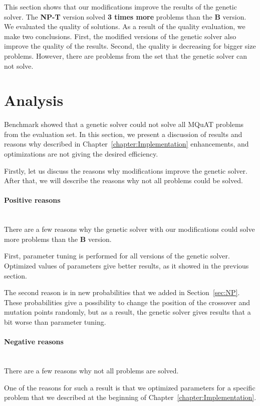 This section shows that our modifications improve the results of the genetic solver. The \textbf{NP-T} version solved \textbf{3 times more} problems than the \textbf{B} version. We evaluated the quality of solutions. As a result of the quality evaluation, we make two conclusions. First, the modified versions of the genetic solver also improve the quality of the results. Second, the quality is decreasing for bigger size problems.
However, there are problems from the set that the genetic solver can not solve.


\section{Analysis}

Benchmark showed that a genetic solver could not solve all MQuAT problems from the evaluation set.
In this section, we present a discussion of results and reasons why described in Chapter~\ref{chapter:Implementation} enhancements, and optimizations are not giving the desired efficiency.

Firstly, let us discuss the reasons why modifications improve the genetic solver. After that, we will describe the reasons why not all problems could be solved.

\paragraph{Positive reasons} \\
There are a few reasons why the genetic solver with our modifications could solve more problems than the \textbf{B} version. 

First, parameter tuning is performed for all versions of the genetic solver. Optimized values of parameters give better results, as it showed in the previous section. 

The second reason is in new probabilities that we added in Section~\ref{sec:NP}. These probabilities give a possibility to change the position of the crossover and mutation points randomly, but as a result, the genetic solver gives results that a bit worse than parameter tuning. 

\paragraph{Negative reasons} \\
There are a few reasons why not all problems are solved.

One of the reasons for such a result is that we optimized parameters for a specific problem that we described at the beginning of Chapter~\ref{chapter:Implementation}.

